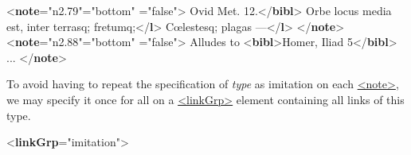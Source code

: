 \begin{shaded}
{<\textbf{note}\hspace*{1em}{xml:id}="{n2.79}"\hspace*{1em}{place}="{bottom}"\mbox{}\newline 
\hspace*{1em}{anchored}="{false}">}\mbox{}\newline 
{}Ovid Met. 12.{</\textbf{bibl}>}\mbox{}\newline 
{}\mbox{}\newline 
\hspace*{1em}Orbe locus media est, inter terrasq; fretumq;{</\textbf{l}>}\mbox{}\newline 
\hspace*{1em}Cœlestesq; plagas —{</\textbf{l}>}\mbox{}\newline 
{}\mbox{}\newline 
{</\textbf{note}>}\mbox{}\newline 
{<\textbf{note}\hspace*{1em}{xml:id}="{n2.88}"\hspace*{1em}{place}="{bottom}"\mbox{}\newline 
\hspace*{1em}{anchored}="{false}">} Alludes to {<\textbf{bibl}>}Homer, Iliad 5{</\textbf{bibl}>} ...\mbox{}\newline 
{</\textbf{note}>}\end{shaded}\egroup\par \noindent  To avoid having to repeat the specification of {\itshape type} as imitation on each \hyperref[TEI.note]{<note>}, we may specify it once for all on a \hyperref[TEI.linkGrp]{<linkGrp>} element containing all links of this type. \par\bgroup{}\exampleFont \begin{shaded}\noindent\mbox{}{<\textbf{linkGrp}\hspace*{1em}{type}="{imitation}">}\mbox{}\newline 

\end{shaded}
